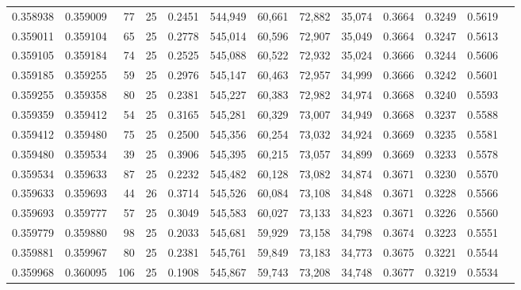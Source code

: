 \begin{tabular}{rrrrrrrrrrrrr}
0.358938 & 0.359009 &    77 &  25 &                                     0.2451 & 544,949 &  60,661 &  72,882 &  35,074 & 0.3664 & 0.3249 & 0.5619 \\
0.359011 & 0.359104 &    65 &  25 &                                     0.2778 & 545,014 &  60,596 &  72,907 &  35,049 & 0.3664 & 0.3247 & 0.5613 \\
0.359105 & 0.359184 &    74 &  25 &                                     0.2525 & 545,088 &  60,522 &  72,932 &  35,024 & 0.3666 & 0.3244 & 0.5606 \\
0.359185 & 0.359255 &    59 &  25 &                                     0.2976 & 545,147 &  60,463 &  72,957 &  34,999 & 0.3666 & 0.3242 & 0.5601 \\
0.359255 & 0.359358 &    80 &  25 &                                     0.2381 & 545,227 &  60,383 &  72,982 &  34,974 & 0.3668 & 0.3240 & 0.5593 \\
0.359359 & 0.359412 &    54 &  25 &                                     0.3165 & 545,281 &  60,329 &  73,007 &  34,949 & 0.3668 & 0.3237 & 0.5588 \\
0.359412 & 0.359480 &    75 &  25 &                                     0.2500 & 545,356 &  60,254 &  73,032 &  34,924 & 0.3669 & 0.3235 & 0.5581 \\
0.359480 & 0.359534 &    39 &  25 &                                     0.3906 & 545,395 &  60,215 &  73,057 &  34,899 & 0.3669 & 0.3233 & 0.5578 \\
0.359534 & 0.359633 &    87 &  25 &                                     0.2232 & 545,482 &  60,128 &  73,082 &  34,874 & 0.3671 & 0.3230 & 0.5570 \\
0.359633 & 0.359693 &    44 &  26 &                                     0.3714 & 545,526 &  60,084 &  73,108 &  34,848 & 0.3671 & 0.3228 & 0.5566 \\
0.359693 & 0.359777 &    57 &  25 &                                     0.3049 & 545,583 &  60,027 &  73,133 &  34,823 & 0.3671 & 0.3226 & 0.5560 \\
0.359779 & 0.359880 &    98 &  25 &                                     0.2033 & 545,681 &  59,929 &  73,158 &  34,798 & 0.3674 & 0.3223 & 0.5551 \\
0.359881 & 0.359967 &    80 &  25 &                                     0.2381 & 545,761 &  59,849 &  73,183 &  34,773 & 0.3675 & 0.3221 & 0.5544 \\
0.359968 & 0.360095 &   106 &  25 &                                     0.1908 & 545,867 &  59,743 &  73,208 &  34,748 & 0.3677 & 0.3219 & 0.5534 \\

\end{tabular}
